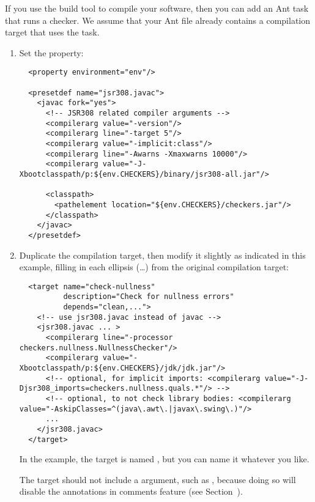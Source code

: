 If you use the  build tool to compile
your software, then you can add an Ant task that runs a checker.  We assume
that your Ant file already contains a compilation target that uses the
 task.

\begin{enumerate}
\item
Set the  property:

\begin{smaller}
\begin{Verbatim}
  <property environment="env"/>

  <presetdef name="jsr308.javac">
    <javac fork="yes">
      <!-- JSR308 related compiler arguments -->
      <compilerarg value="-version"/>
      <compilerarg line="-target 5"/>
      <compilerarg value="-implicit:class"/>
      <compilerarg line="-Awarns -Xmaxwarns 10000"/>
      <compilerarg value="-J-Xbootclasspath/p:${env.CHECKERS}/binary/jsr308-all.jar"/>

      <classpath>
        <pathelement location="${env.CHECKERS}/checkers.jar"/>
      </classpath>
    </javac>
  </presetdef>
\end{Verbatim}
\end{smaller}

\item Duplicate the compilation target, then modify it slightly as
indicated in this example, filling in each ellipsis (\ldots) from the
original compilation target:

\begin{smaller}
\begin{Verbatim}
  <target name="check-nullness"
          description="Check for nullness errors"
          depends="clean,...">
    <!-- use jsr308.javac instead of javac -->
    <jsr308.javac ... >
      <compilerarg line="-processor checkers.nullness.NullnessChecker"/>
      <compilerarg value="-Xbootclasspath/p:${env.CHECKERS}/jdk/jdk.jar"/>
      <!-- optional, for implicit imports: <compilerarg value="-J-Djsr308_imports=checkers.nullness.quals.*"/> -->
      <!-- optional, to not check library bodies: <compilerarg value="-AskipClasses=^(java\.awt\.|javax\.swing\.)"/>
      ...
    </jsr308.javac>
  </target>
\end{Verbatim}
\end{smaller}

In the example, the target is named , but you can
name it whatever you like.

The target should not include a  argument, such as
, because doing so will disable the annotations in
comments feature (see Section~).
\end{enumerate}

